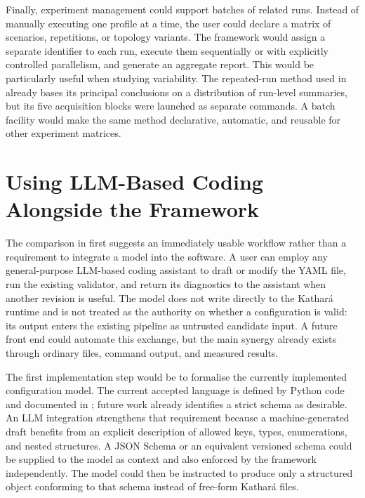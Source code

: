 Finally, experiment management could support batches of related runs. Instead
of manually executing one profile at a time, the user could declare a matrix
of scenarios, repetitions, or topology variants. The framework would assign a
separate identifier to each run, execute them sequentially or with explicitly
controlled parallelism, and generate an aggregate report. This would be
particularly useful when studying variability. The repeated-run method used in
 already bases its principal conclusions on
a distribution of run-level summaries, but its five acquisition blocks were
launched as separate commands. A batch facility would make the same method
declarative, automatic, and reusable for other experiment matrices.


\section{Using LLM-Based Coding Alongside the Framework}
\label{sec:future-llm-integration}

The comparison in  first suggests an immediately usable
workflow rather than a requirement to integrate a model into the software. A
user can employ any general-purpose LLM-based coding assistant to draft or
modify the YAML file, run the existing validator, and return its diagnostics to
the assistant when another revision is useful. The model does not write
directly to the Kathar\'a runtime and is not treated as the authority on whether
a configuration is valid: its output enters the existing pipeline as untrusted
candidate input. A future front end could automate this exchange, but the main
synergy already exists through ordinary files, command output, and measured
results.

The first implementation step would be to formalise the currently implemented
configuration model. The current accepted language is defined by Python code
and documented in ; future work already identifies a strict
schema as desirable. An LLM integration strengthens that requirement because a
machine-generated draft benefits from an explicit description of allowed keys,
types, enumerations, and nested structures. A JSON Schema or an equivalent
versioned schema could be supplied to the model as context and also enforced by
the framework independently. The model could then be instructed to produce
only a structured object conforming to that schema instead of free-form
Kathar\'a files.

